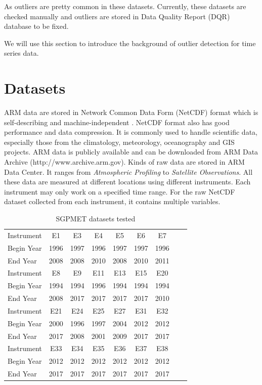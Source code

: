 \documentclass[letterpaper, 10 pt, conference]{ieeeconf}  %
\begin{document}
As outliers are pretty common in these datasets. Currently, these datasets are checked manually and outliers are stored in Data Quality Report (DQR) database to be fixed. 

We will use this section to introduce the background of outlier detection for time series data. \cite{gupta2014outlier} 


\section{Datasets}
ARM data are stored in Network Common Data Form (NetCDF) format which is self-describing and machine-independent \cite{rew1990netcdf, NetCDF}. NetCDF format also has good performance and data compression. It is commonly used to handle scientific data, especially those from the climatology, meteorology, oceanography and GIS projects. ARM data is publicly available and can be downloaded from ARM Data Archive (http://www.archive.arm.gov). Kinds of raw data are stored in ARM Data Center. It ranges from \textit{Atmospheric Profiling} to \textit{Satellite Observations}. All these data are measured at different locations using different instruments. Each instrument may only work on a specified time range. For the raw NetCDF dataset collected from each instrument, it contains multiple variables. 

\begin{table}[ht]
\caption{SGPMET datasets tested}
\label{tab:datasets}
\centering
\begin{tabular}{|l|c|c|c|c|c|c|c|c|}
\hline
Instrument & E1 & E3 & E4 & E5 & E6 & E7\\
Begin Year & 1996 & 1997 & 1996 & 1997 & 1997 & 1996\\
End Year & 2008 & 2008 & 2010 & 2008 & 2010 & 2011\\
\hline
Instrument & E8 & E9 & E11 & E13 & E15 & E20\\
Begin Year & 1994 & 1994 & 1996 & 1994 & 1994 & 1994\\
End Year & 2008 & 2017 & 2017 & 2017 & 2017 & 2010\\
\hline
Instrument & E21 & E24 & E25 & E27 & E31 & E32\\
Begin Year & 2000 & 1996 & 1997 & 2004 & 2012 & 2012\\
End Year & 2017 & 2008 & 2001 & 2009 & 2017 & 2017\\
\hline
Instrument & E33 & E34 & E35 & E36 & E37 & E38\\
Begin Year & 2012 & 2012 & 2012 & 2012 & 2012 & 2012\\
End Year & 2017 & 2017 & 2017 & 2017 & 2017 & 2017\\
\hline
\end{tabular}
\end{table}
\end{document}
